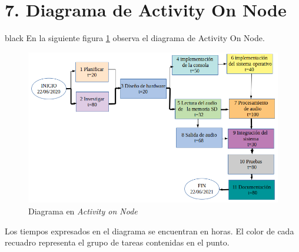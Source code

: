 \documentclass[11pt]{charter}
\begin{document}
\section{7. Diagrama de Activity On Node}
\label{sec:AoN}

\begin{consigna}{black}
En la siguiente figura \ref{fig:AoN} observa el diagrama de Activity On Node.

\begin{figure}[htpb]
\centering 
\includegraphics[width=.9\textwidth]{./Figuras/AoN.png}
\caption{Diagrama en \textit{Activity on Node}}
\label{fig:AoN}
\end{figure}


Los tiempos expresados en el diagrama se encuentran en horas. El color de cada recuadro
representa el grupo de tareas contenidas en el punto.

\end{consigna}
\end{document}
